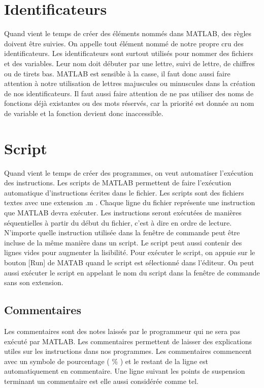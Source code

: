 \documentclass{tufte-handout}
\begin{document}
\section{Identificateurs}
Quand vient le temps de créer des éléments nommés dans MATLAB, des règles doivent être suivies. On appelle tout élément nommé de notre propre cru des identificateurs. Les identificateurs sont surtout utilisés pour nommer des fichiers et des variables.
Leur nom doit débuter par une lettre, suivi de lettre, de chiffres ou de tirets bas. MATLAB est sensible à la casse, il faut donc aussi faire attention à notre utilisation de lettres majuscules ou minuscules dans la création de nos identificateurs.
Il faut aussi faire attention de ne pas utiliser des noms de fonctions déjà existantes ou des mots réservés, car la priorité est donnée au nom de variable et la fonction devient donc inaccessible.

\section{Script}
Quand vient le temps de créer des programmes, on veut automatiser l'exécution des instructions. Les scripts de MATLAB permettent de faire l'exécution automatique d'instructions écrites dans le fichier.
Les scripts sont des fichiers textes avec une extension .m . Chaque ligne du fichier représente une instruction que MATLAB devra exécuter. Les instructions seront exécutées de manières séquentielles à partir du début du fichier, c'est à dire en ordre de lecture.
N'importe quelle instruction utilisée dans la fenêtre de commande peut être incluse de la même manière dans un script. Le script peut aussi contenir des lignes vides pour augmenter la lisibilité.
Pour exécuter le script, on appuie sur le bouton [Run] de MATAB quand le script est sélectionné dans l'éditeur. On peut aussi exécuter le script en appelant le nom du script dans la fenêtre de commande sans son extension.
\subsection{Commentaires}
Les commentaires sont des notes laissés par le programmeur qui ne sera pas exécuté par MATLAB. Les commentaires permettent de laisser des explications utiles sur les instructions dans nos programmes.
Les commentaires commencent avec un symbole de pourcentage ( \% ) et le restant de la ligne est automatiquement en commentaire. Une ligne suivant les points de suspension terminant un commentaire est elle aussi considérée comme tel.
\end{document}
